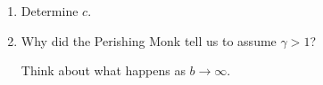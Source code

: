\begin{enumerate}
  \begin{enumerate}

  \item
    Determine $c$.  

    
   \solutionstart


   \solutionend

  \item
    Why did the Perishing Monk tell us to assume $\gamma>1$?

    Think about what happens as $b \rightarrow \infty$.
    
    
   \solutionstart


   \solutionend

  \end{enumerate}

  
\end{enumerate}
